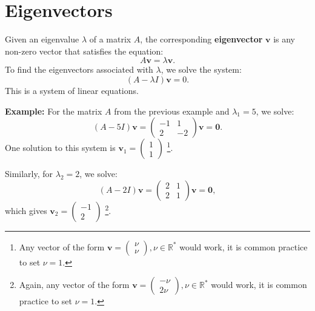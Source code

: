 \documentclass[]{article}
\newcommand{\R}{\mathbb{R}}
\begin{document}
	\section{Eigenvectors}
	
	Given an eigenvalue $\lambda$ of a matrix $A$, the corresponding \textbf{eigenvector} $\mathbf{v}$ is any non-zero vector that satisfies the equation:
	$$
	A \mathbf{v} = \lambda \mathbf{v}.
	$$
	To find the eigenvectors associated with $\lambda$, we solve the system:
	$$
	(A - \lambda I)\mathbf{v} = 0.
	$$
	This is a system of linear equations.
	
	\noindent \textbf{Example:}
	For the matrix $ A $ from the previous example and $ \lambda_1 = 5 $, we solve:
	$$
	(A - 5I)\mathbf{v} = \begin{pmatrix}
		-1 & 1 \\
		2 & -2
	\end{pmatrix} \mathbf{v} = \mathbf{0}.
	$$
	One solution to this system is $\mathbf{v}_1 = \begin{pmatrix} 1 \\ 1 \end{pmatrix}$
	\footnote{Any vector of the form $\mathbf{v} = \begin{pmatrix} \nu \\ \nu \end{pmatrix}, \nu \in \R^*$ would work, it is common practice to set $\nu=1$.}.
	
	Similarly, for $ \lambda_2 = 2 $, we solve:
	$$
	(A - 2I)\mathbf{v} = \begin{pmatrix}
		2 & 1 \\
		2 & 1
	\end{pmatrix} \mathbf{v} = \mathbf{0},
	$$
	which gives $\mathbf{v}_2 = \begin{pmatrix} -1 \\ 2 \end{pmatrix}$ 	\footnote{Again, any vector of the form $\mathbf{v} = \begin{pmatrix} -\nu \\ 2\nu \end{pmatrix}, \nu \in \R^*$ would work, it is common practice to set $\nu=1$.}.
\end{document}
